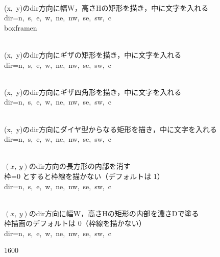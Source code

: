 \documentclass[a4j]{jarticle}
\begin{document}
\\
\tab{}(x,\ y)のdir方向に幅W，高さHの矩形を描き，中に文字を入れる\\
\chuu dir=n,\ s,\ e,\ w,\ ne,\ nw,\ se,\ sw,\ c \\
\rei \bs boxframen\br{}


\\
\tab{}(x,\ y)のdir方向にギザの矩形を描き，中に文字を入れる\\
\chuu dir=n,\ s,\ e,\ w,\ ne,\ nw,\ se,\ sw,\ c 

\\
\tab{}(x,\ y)のdir方向にギザ四角形を描き，中に文字を入れる\\
\chuu dir=n,\ s,\ e,\ w,\ ne,\ nw,\ se,\ sw,\ c 

\\
\tab{}(x,\ y)のdir方向にダイヤ型からなる矩形を描き，中に文字を入れる\\
\chuu dir=n,\ s,\ e,\ w,\ ne,\ nw,\ se,\ sw,\ c 

\\
\tab{}$(x,\ y)$のdir方向の長方形の内部を消す\\
\chuu 枠=0 とすると枠線を描かない（デフォルトは 1）\\
\chuu dir=n,\ s,\ e,\ w,\ ne,\ nw,\ se,\ sw,\ c 

\\
\tab{}$(x,\ y)$のdir方向に幅W，高さHの矩形の内部を濃さDで塗る\\
\chuu 枠描画のデフォルトは 0（枠線を描かない）\\
\chuu dir=n,\ s,\ e,\ w,\ ne,\ nw,\ se,\ sw,\ c 

\vspace{\baselineskip}

\begin{layer}{160}{0}


\end{layer}
\end{document}
